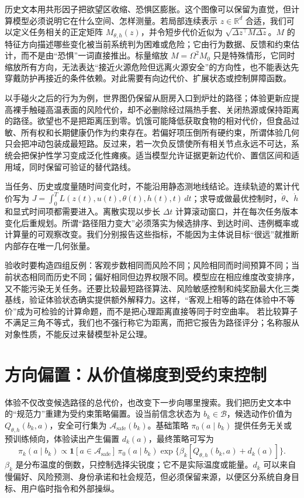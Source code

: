 历史文本用共形因子把欲望区收缩、恐惧区膨胀。这个图像可以保留为直觉，但计算模型必须说明它在什么空间、怎样测量。若局部连续表示 $z\in\mathbb R^d$ 合适，我们可以定义任务相关的正定矩阵 $M_{\theta,h}(z)$，并令短步代价近似为 $\sqrt{\Delta z^\top M\Delta z}$。$M$ 的特征方向描述哪些变化被当前系统判为困难或危险；它由行为数据、反馈和约束估计，而不是由“恐惧”一词直接推出。标量缩放 $M=\Omega^2M_0$ 只是特殊情形，它同时缩放所有方向，无法表达“接近火源危险但远离火源安全”的方向性，也不能表达先穿戴防护再接近的条件依赖。对此需要有向边代价、扩展状态或控制屏障函数。

以手碰火之后的行为为例，世界图仍保留从厨房入口到炉灶的路径；体验更新应提高裸手触碰高温表面的风险代价，却不必删除经过隔热手套、关闭热源或保持距离的路径。欲望也不是把距离压到零。饥饿可能降低获取食物的相对代价，但食品过敏、所有权和长期健康仍作为约束存在。若偏好项压倒所有硬约束，所谓体验几何只会把冲动包装成最短路。反过来，若一次负反馈使所有相关节点永远不可达，系统会把保护性学习变成泛化性瘫痪。适当模型允许证据更新边代价、置信区间和适用域，同时保留可验证的替代路线。

当任务、历史或度量随时间变化时，不能沿用静态测地线结论。连续轨迹的累计代价写为 $J=\int_0^T L(z(t),u(t),\theta(t),h(t),t)\,dt$；求导或做最优控制时，$\dot\theta$、$\dot h$ 和显式时间项都需要进入。离散实现以步长 $\Delta t$ 计算滚动窗口，并在每次任务版本变化后重规划。所谓“路径阻力变大”必须落实为候选排序、到达时间、违例概率或计算量的可观察改变。我们分别报告这些指标，不能因为主体说目标“很远”就推断内部存在唯一几何张量。

验收时要构造四组反例：客观步数相同而风险不同；风险相同而时间预算不同；当前状态相同而历史不同；偏好相同但边界权限不同。模型应在相应维度改变排序，又不能污染无关任务。还要比较最短路径算法、风险敏感控制和纯奖励最大化三类基线，验证体验状态确实提供额外解释力。这样，“客观上相等的路在体验中不等价”成为可检验的计算命题，而不是把心理距离直接等同于时空曲率。
若比较算子不满足三角不等式，我们也不强行称它为距离，而把它报告为路径评分；名称服从对象性质，不能反过来替模型补足公理。

\section{方向偏置：从价值梯度到受约束控制}
\label{sec:section_7773}
体验不仅改变候选路径的总代价，也改变下一步向哪里搜索。我们把历史文本中的“规范力”重建为受约束策略偏置。设当前信念状态为 $b_k\in\mathcal B$，候选动作价值为 $Q_{\theta,h}(b_k,a)$，安全可行集为 $\mathcal A_{\mathrm{safe}}(b_k)$。基础策略 $\pi_0(a\mid b_k)$ 提供任务无关或预训练倾向，体验读出产生偏置 $d_k(a)$，最终策略可写为
\[
\pi_k(a\mid b_k)\propto \mathbf 1[a\in\mathcal A_{\mathrm{safe}}]\,\pi_0(a\mid b_k)
\exp\{\beta_k[Q_{\theta,h}(b_k,a)+d_k(a)]\}.
\]
$\beta_k$ 是分布温度的倒数，只控制选择尖锐度；它不是实际温度或能量。$d_k$ 可以来自慢偏好、风险预测、身份承诺和社会规范，但必须保留来源，以便区分系统自身目标、用户临时指令和外部操纵。

